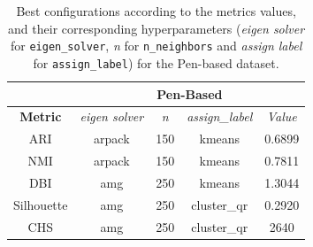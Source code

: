 \begin{table}[h!]
	\centering
	\begin{tabular}{|c|c|c|c|c|}
		\hline
		&  \multicolumn{4}{c|}{\textbf{Pen-Based}} \\ \hline
		\textbf{Metric}  &\textit{eigen solver} & \textit{n} & \textit{assign\_label} & \textit{Value} \\ \hline
		ARI             & arpack  & 150 & kmeans & 0.6899 \\ \hline
		NMI            & arpack   & 150 & kmeans & 0.7811 \\ \hline
		DBI            & amg & 250 & kmeans & 1.3044 \\ \hline
		Silhouette      & amg & 250 & cluster\_qr & 0.2920\\ \hline
		CHS            & amg & 250 & cluster\_qr & 2640\\ \hline
	\end{tabular}
	\caption{Best configurations according to the metrics values, and their corresponding hyperparameters (\textit{eigen solver} for \texttt{eigen\_solver}, \textit{n} for \texttt{n\_neighbors} and \textit{assign label} for \texttt{assign\_label}) for the Pen-based dataset.}
	\label{tab:spectral_best_runs_spectral_pb}
\end{table}



